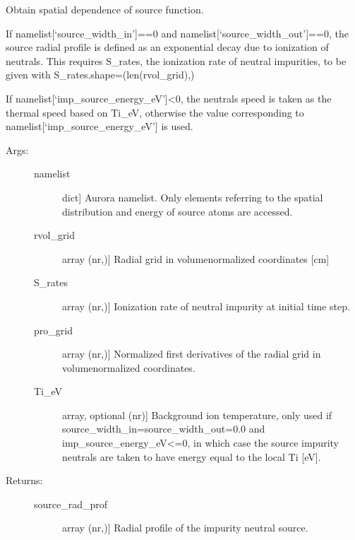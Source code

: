 \documentclass[letterpaper,10pt,english]{sphinxmanual}
\begin{document}
\begin{fulllineitems}
\label{\detokenize{aurora:aurora.source_utils.get_radial_source}}
Obtain spatial dependence of source function.

If namelist{[}‘source\_width\_in’{]}==0 and namelist{[}‘source\_width\_out’{]}==0, the source
radial profile is defined as an exponential decay due to ionization of neutrals. This requires
S\_rates, the ionization rate of neutral impurities, to be given with S\_rates.shape=(len(rvol\_grid),)

If namelist{[}‘imp\_source\_energy\_eV’{]}\textless{}0, the neutrals speed is taken as the thermal speed based
on Ti\_eV, otherwise the value corresponding to namelist{[}‘imp\_source\_energy\_eV’{]} is used.
\begin{description}
\item[{Args:}] \leavevmode\begin{description}
\item[{namelist}] \leavevmode{[}dict{]}
Aurora namelist. Only elements referring to the spatial distribution and energy of 
source atoms are accessed.

\item[{rvol\_grid}] \leavevmode{[}array (nr,){]}
Radial grid in volume\sphinxhyphen{}normalized coordinates {[}cm{]}

\item[{S\_rates}] \leavevmode{[}array (nr,){]}
Ionization rate of neutral impurity at initial time step.

\item[{pro\_grid}] \leavevmode{[}array (nr,){]}
Normalized first derivatives of the radial grid in volume\sphinxhyphen{}normalized coordinates.

\item[{Ti\_eV}] \leavevmode{[}array, optional (nr){]}
Background ion temperature, only used if source\_width\_in=source\_width\_out=0.0 and 
imp\_source\_energy\_eV\textless{}=0, in which case the source impurity neutrals are taken to 
have energy equal to the local Ti {[}eV{]}.

\end{description}

\item[{Returns:}] \leavevmode\begin{description}
\item[{source\_rad\_prof}] \leavevmode{[}array (nr,){]}
Radial profile of the impurity neutral source.

\end{description}

\end{description}

\end{fulllineitems}
\end{document}
